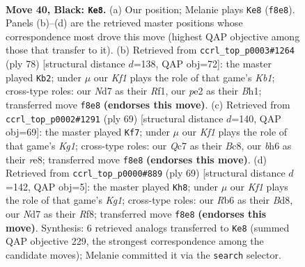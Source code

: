 \documentclass[11pt]{article}
\begin{document}
\clearpage

\begin{figure}[p]\centering
\begin{subfigure}{0.46\textwidth}\centering
\resizebox{\linewidth}{!}{%
\newchessgame
\chessboard[
  setfen={2b2k2/p1qn1r1p/1r3b1B/P4P1N/1p1p4/1p6/R3P1Q1/1N1K2R1 b - - 3 40},
  showmover=false,
  pgfstyle=straightmove, color=movearrow, markmove={f8-e8}
]}
\caption{}
\end{subfigure}\hfill
\begin{subfigure}{0.46\textwidth}\centering
\resizebox{\linewidth}{!}{%
\newchessgame
\chessboard[
  setfen={1k2r3/1pq2p1p/p2p4/5r2/P4N2/n1P4P/P6Q/1K1R1R1B w - - 1 40},
  showmover=false,
  pgfstyle=straightmove, color=movearrow, markmove={b1-b2}
]}
\caption{}
\end{subfigure}
\\[4pt]
\begin{subfigure}{0.46\textwidth}\centering
\resizebox{\linewidth}{!}{%
\newchessgame
\chessboard[
  setfen={1rb1R1k1/3n4/p2p1q2/2pP2pP/2P3p1/3Q1r2/P1B3N1/R5K1 b - - 6 35},
  showmover=false,
  pgfstyle=straightmove, color=movearrow, markmove={g8-f7}
]}
\caption{}
\end{subfigure}\hfill
\begin{subfigure}{0.46\textwidth}\centering
\resizebox{\linewidth}{!}{%
\newchessgame
\chessboard[
  setfen={3b1rk1/2q5/5p1P/r3n1pP/p1PN2b1/Pp6/1P1Q3R/K1R2BB1 b - - 3 35},
  showmover=false,
  pgfstyle=straightmove, color=movearrow, markmove={g8-h8}
]}
\caption{}
\end{subfigure}
\caption{\textbf{Move 40, Black: \texttt{Ke8}.} (a) Our position; Melanie plays \texttt{Ke8} (\texttt{f8e8}). Panels (b)--(d) are the retrieved master positions whose correspondence most drove this move (highest QAP objective among those that transfer to it). (b) Retrieved from \texttt{ccrl\_top\_p0003\#1264} (ply 78) [structural distance $d$=138, QAP obj=72]: the master played \texttt{Kb2}; under $\mu$ our \emph{Kf1} plays the role of that game's \emph{Kb1}; cross-type roles: our \emph{N}d7 as their \emph{R}f1, our \emph{p}e2 as their \emph{B}h1; transferred move \texttt{f8e8} \textbf{(endorses this move)}. (c) Retrieved from \texttt{ccrl\_top\_p0002\#1291} (ply 69) [structural distance $d$=140, QAP obj=69]: the master played \texttt{Kf7}; under $\mu$ our \emph{Kf1} plays the role of that game's \emph{Kg1}; cross-type roles: our \emph{Q}c7 as their \emph{B}c8, our \emph{b}h6 as their \emph{r}e8; transferred move \texttt{f8e8} \textbf{(endorses this move)}. (d) Retrieved from \texttt{ccrl\_top\_p0000\#889} (ply 69) [structural distance $d$=142, QAP obj=5]: the master played \texttt{Kh8}; under $\mu$ our \emph{Kf1} plays the role of that game's \emph{Kg1}; cross-type roles: our \emph{R}b6 as their \emph{B}d8, our \emph{N}d7 as their \emph{R}f8; transferred move \texttt{f8e8} \textbf{(endorses this move)}. Synthesis: 6 retrieved analogs transferred to \texttt{Ke8} (summed QAP objective 229, the strongest correspondence among the candidate moves); Melanie committed it via the \texttt{search} selector.}
\label{fig:thought-m79}
\end{figure}
\end{document}
